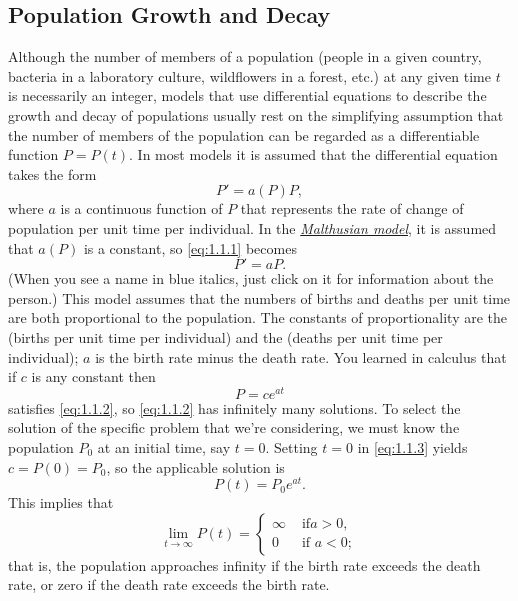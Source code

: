 \documentclass{ximera}
\begin{document}
\subsection*{Population Growth and Decay}
Although the number of members of a population (people in a given
country, bacteria in a laboratory culture, wildflowers in a forest,
etc.)
at any given time $t$ is necessarily an integer, models that use
differential equations to describe the growth and decay of populations
usually rest on the simplifying assumption that the number of members of
the population can be regarded as a differentiable function $P=P(t)$.
In most models it is assumed that the differential equation takes the
form
\begin{equation} \label{eq:1.1.1}
P'=a(P)P,
\end{equation}
where $a$ is a continuous function of $P$ that represents the rate of
change of population per unit time per individual.
In the
\href{http://en.wikipedia.org/wiki/Thomas_Robert_Malthus}
{\color{blue}\it Malthusian model},
 it is assumed that
$a(P)$ is a constant, so \eqref{eq:1.1.1} becomes
\begin{equation} \label{eq:1.1.2}
P'=aP.
\end{equation}
\color{blue}
(When you see a name in blue italics, just click on it for
information about the person.)
\color{black}
This model assumes that the numbers of births and deaths per unit time
are both proportional to the population. The constants of
proportionality are  the   (births per unit
time per individual) and the  (deaths per unit time
per individual);     $a$ is the birth rate minus the death rate.
You  learned in calculus that if $c$ is any constant then
\begin{equation} \label{eq:1.1.3}
P=ce^{at}
\end{equation}
satisfies \eqref{eq:1.1.2}, so \eqref{eq:1.1.2} has infinitely
many solutions. To select the solution of the specific problem that
we're considering, we must know the population $P_0$ at an initial
time, say $t=0$. Setting $t=0$ in \eqref{eq:1.1.3} yields
$c=P(0)=P_0$, so the applicable solution is
$$
P(t)=P_0e^{at}.
$$
This implies that
$$
\lim_{t\to\infty}P(t)=\left\{\begin{array}{cl}\infty&\mbox{ if
}a>0,\\ 0&\mbox{ if }a<0;    \end{array}\right.
$$
that is, the population approaches infinity if the birth rate exceeds
the death rate, or zero if the death rate exceeds the birth rate.
\end{document}
